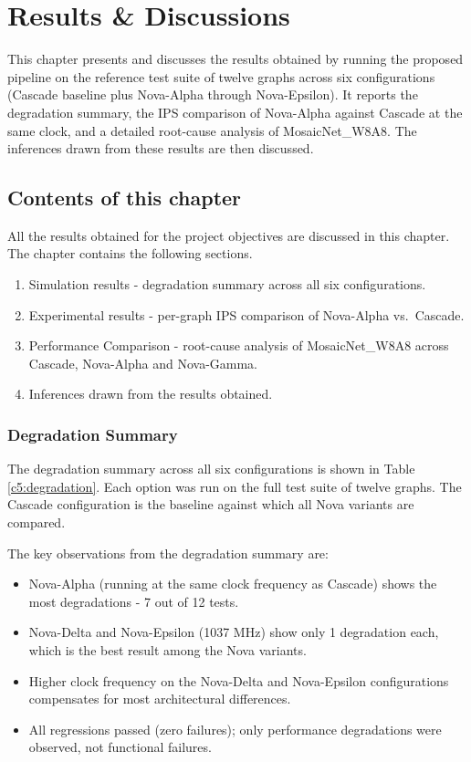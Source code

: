 \chapter{Results \& Discussions}
This chapter presents and discusses the results obtained by running the proposed pipeline on the reference test suite of twelve graphs across six configurations (Cascade baseline plus Nova-Alpha through Nova-Epsilon). It reports the degradation summary, the IPS comparison of Nova-Alpha against Cascade at the same clock, and a detailed root-cause analysis of MosaicNet\_W8A8. The inferences drawn from these results are then discussed.

\section{Contents of this chapter}
All the results obtained for the project objectives are discussed in this chapter. The chapter contains the following sections.
\begin{enumerate}
\item Simulation results - degradation summary across all six configurations.
\item Experimental results - per-graph IPS comparison of Nova-Alpha vs.\ Cascade.
\item Performance Comparison - root-cause analysis of MosaicNet\_W8A8 across Cascade, Nova-Alpha and Nova-Gamma.
\item Inferences drawn from the results obtained.
\end{enumerate}

\subsection{Degradation Summary}
The degradation summary across all six configurations is shown in Table \ref{c5:degradation}. Each option was run on the full test suite of twelve graphs. The Cascade configuration is the baseline against which all Nova variants are compared.

The key observations from the degradation summary are:
\begin{itemize}
\item Nova-Alpha (running at the same clock frequency as Cascade) shows the most degradations - 7 out of 12 tests.
\item Nova-Delta and Nova-Epsilon (1037 MHz) show only 1 degradation each, which is the best result among the Nova variants.
\item Higher clock frequency on the Nova-Delta and Nova-Epsilon configurations compensates for most architectural differences.
\item All regressions passed (zero failures); only performance degradations were observed, not functional failures.
\end{itemize}

